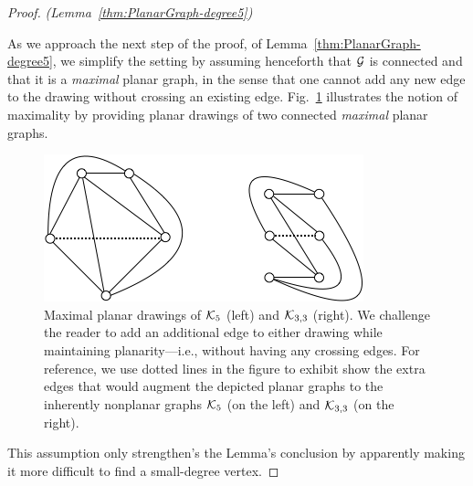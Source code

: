 \begin{proof} {\em (Lemma~\ref{thm:PlanarGraph-degree5})}
\medskip

As we approach the next step of the proof, of Lemma~\ref{thm:PlanarGraph-degree5}, we 
simplify the setting by assuming henceforth that  $\mbox{$\cal G$}$ is connected and that it is a 
{\em maximal} planar graph, in the sense that one cannot add any new edge to the 
drawing without crossing an existing edge.  Fig.~\ref{fig:K5andK3by3} illustrates the notion 
of maximality by providing planar drawings of two connected {\em maximal} planar graphs.
\begin{figure}[hbt]
\begin{center}
       \includegraphics[scale=0.55]{FiguresGraph/K5andK3by3}
       \caption{Maximal planar drawings of $\mbox{$\cal K$}_5$ (left) and $\mbox{$\cal K$}_{3,3}$ (right).  We challenge the 
       reader to add an additional edge to either drawing while maintaining planarity---i.e., without
       having any crossing edges.  For reference, we use dotted lines in the figure to exhibit
       show the extra edges that would augment the depicted planar graphs to the
       inherently nonplanar graphs $\mbox{$\cal K$}_5$ (on the left) and $\mbox{$\cal K$}_{3,3}$ (on the right).}
  \label{fig:K5andK3by3}
\end{center}
\end{figure}
This assumption only strengthen's the Lemma's conclusion by apparently making it more 
difficult to find a small-degree vertex.



\end{proof}
